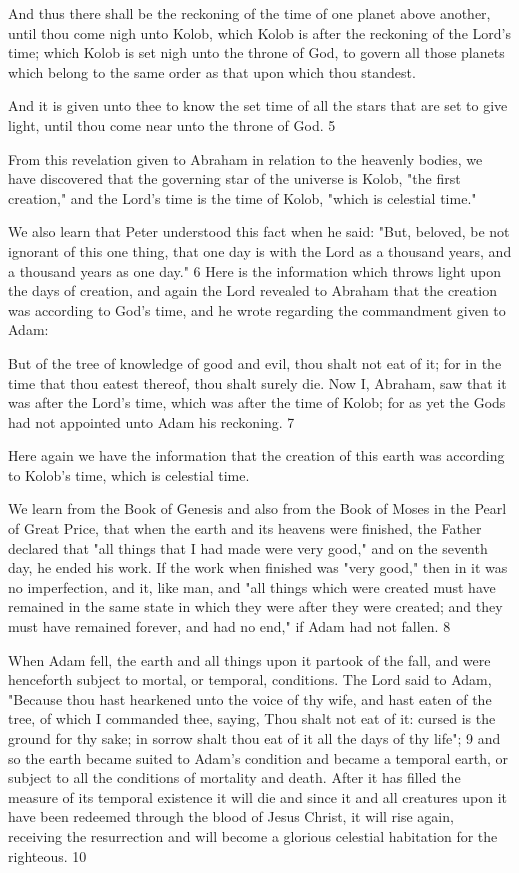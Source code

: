 And thus there shall be the reckoning of the time of one planet above another, until thou
come nigh unto Kolob, which Kolob is after the reckoning of the Lord's time; which Kolob is
set nigh unto the throne of God, to govern all those planets which belong to the same order as
that upon which thou standest.

And it is given unto thee to know the set time of all the stars that are set to give light, until
thou come near unto the throne of God. 5

From this revelation given to Abraham in relation to the heavenly bodies, we have
discovered that the governing star of the universe is Kolob, "the first creation," and the Lord's
time is the time of Kolob, "which is celestial time."

We also learn that Peter understood this fact when he said: "But, beloved, be not ignorant of
this one thing, that one day is with the Lord as a thousand years, and a thousand years as one
day." 6 Here is the information which throws light upon the days of creation, and again the
Lord revealed to Abraham that the creation was according to God's time, and he wrote
regarding the commandment given to Adam:

But of the tree of knowledge of good and evil, thou shalt not eat of it; for in the time that thou
eatest thereof, thou shalt surely die. Now I, Abraham, saw that it was after the Lord's time,
which was after the time of Kolob; for as yet the Gods had not appointed unto Adam his
reckoning. 7

Here again we have the information that the creation of this earth was according to Kolob's
time, which is celestial time.

We learn from the Book of Genesis and also from the Book of Moses in the Pearl of Great
Price, that when the earth and its heavens were finished, the Father declared that "all things
that I had made were very good," and on the seventh day, he ended his work. If the work
when finished was "very good," then in it was no imperfection, and it, like man, and "all
things which were created must have remained in the same state in which they were after
they were created; and they must have remained forever, and had no end," if Adam had not
fallen. 8

When Adam fell, the earth and all things upon it partook of the fall, and were henceforth
subject to mortal, or temporal, conditions. The Lord said to Adam, "Because thou hast
hearkened unto the voice of thy wife, and hast eaten of the tree, of which I commanded thee,
saying, Thou shalt not eat of it: cursed is the ground for thy sake; in sorrow shalt thou eat of
it all the days of thy life"; 9 and so the earth became suited to Adam's condition and became a
temporal earth, or subject to all the conditions of mortality and death. After it has filled the
measure of its temporal existence it will die and since it and all creatures upon it have been
redeemed through the blood of Jesus Christ, it will rise again, receiving the resurrection and
will become a glorious celestial habitation for the righteous. 10

